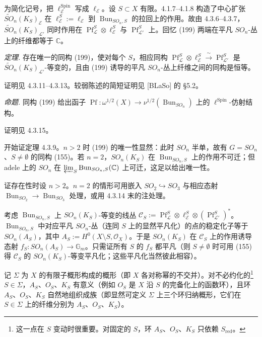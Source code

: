 为简化记号，把 $\ell^{\operatorname{Spin}}_{\mathcal{E}}$ 写成 $\ell_{\mathcal{E}}$。设 $S\subset X$ 有限。4.1.7–4.1.8 构造了中心扩张 $\tilde{SO}_{n}(K_{S})_{\mathcal{E}}$ 在 $\ell^{S}_{\mathcal{E}}:=\ell_{\mathcal{E}}$ 到 $\operatorname{Bun}_{SO_{n},S}$ 的拉回上的作用。故由 4.3.6–4.3.7，$\tilde{SO}_{n}(K_{S})_{\mathcal{L}'}$ 同时作用在 $\operatorname{Pf}_{\mathcal{L}}^{S}\otimes\ell^{S}_{\mathcal{E}}$ 与 $\operatorname{Pf}_{\mathcal{L}'}^{S}$ 上。回忆 (199) 两端在平凡 $SO_{n}$-丛上的纤维都等于 $\mathbb{C}$。

 \emph{定理.} 存在唯一的同构 (199)，使对每个 $S$，相应同构 $\operatorname{Pf}_{\mathcal{L}}^{S}\otimes\ell^{S}_{\mathcal{E}}\xrightarrow{\ \sim\ }\operatorname{Pf}_{\mathcal{L}'}^{S}$ 是 $\tilde{SO}_{n}(K_{S})_{\mathcal{L}'}$-等变的，且由 (199) 诱导的平凡 $SO_{n}$-丛上纤维之间的同构是恒等。

证明见 4.3.11–4.3.13。较弱陈述的简短证明见 [BLaSo] 的 §5.2。

 \emph{命题.} 同构 (199) 给出函子 $\operatorname{Pf}:\omega^{1/2}(X)\to\nu^{1/2}(\operatorname{Bun}_{SO_{n}})$ 上的 $\ell^{\operatorname{Spin}}$-仿射结构。

证明见 4.3.15。

 开始证定理 4.3.9。$n>2$ 时 (199) 的唯一性显然：此时 $SO_{n}$ 半单，故有 $G=SO_{n}$、$S\neq\emptyset$ 的同构 (155)。若 $n=2$，$SO_{n}(K_{S})$ 在 $\operatorname{Bun}_{SO_{n},S}$ 上的作用不可迁；但 adele 上的 $SO_{n}$ 在 $\varprojlim_{S}\operatorname{Bun}_{SO_{n},S}(\mathbb{C})$ 上可迁，这足以给出唯一性。

证存在性时设 $n>2$。$n=2$ 的情形可用嵌入 $SO_{2}\hookrightarrow SO_{3}$ 与相应态射 $\operatorname{Bun}_{SO_{2}}\to\operatorname{Bun}_{SO_{3}}$ 处理，或用 4.3.14 末的注处理。

考虑 $\operatorname{Bun}_{SO_{n},S}$ 上 $SO_{n}(K_{S})$-等变的线丛 $\mathcal{C}_{S}:=\operatorname{Pf}_{\mathcal{L}}^{S}\otimes\ell^{S}_{\mathcal{E}}\otimes(\operatorname{Pf}_{\mathcal{L}'}^{S})^{*}$。$\operatorname{Bun}_{SO_{n},S}$ 中对应平凡 $SO_{n}$-丛（连同 $S$ 上的显然平凡化）的点的稳定化子等于 $SO_{n}(A_{S})$，其中 $A_{S}:=H^{0}(X\setminus S,\mathcal{O}_{X})$。于是 $SO_{n}(K_{S})$ 在 $\mathcal{C}_{S}$ 上的作用诱导态射 $f_{S}:SO_{n}(A_{S})\to\mathbb{G}_{m}$。只需证所有 $S$ 的 $f_{S}$ 都平凡（则 $S\neq\emptyset$ 时可用 (155) 得 $\mathcal{C}_{S}$ 的 $SO_{n}(K_{S})$-等变平凡化；这些平凡化当然彼此相容）。

记 $\Sigma$ 为 $X$ 的有限子概形构成的概形（即 $X$ 各对称幂的不交并）。对不必约化的\footnote{这一点在 $S$ 变动时很重要。对固定的 $S$，环 $A_{S}$、$O_{S}$、$K_{S}$ 只依赖 $S_{\mathrm{red}}$。} $S\in\Sigma$，$A_{S}$、$O_{S}$、$K_{S}$ 有意义（例如 $O_{S}$ 是 $X$ 沿 $S$ 的完备化上的函数环），且环 $A_{S}$、$O_{S}$、$K_{S}$ 自然地组织成族（即显然可定义 $\Sigma$ 上三个环归纳概形，它们在 $S\in\Sigma$ 上的纤维分别为 $A_{S}$、$O_{S}$、$K_{S}$）。

